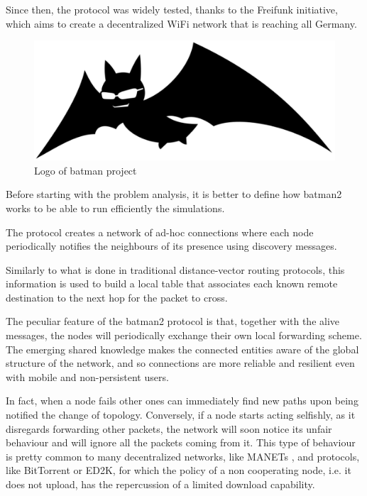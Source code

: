 \documentclass[conference,10.5pt]{IEEEtran}
\begin{document}
Since then, the protocol was widely tested,  thanks to the Freifunk initiative, which aims to create a decentralized WiFi network that is reaching all Germany.

\begin{figure}[h]
  \centering
  \includegraphics[width=0.8\linewidth]{figures/logo.pdf}
  \caption{Logo of \gls{batman} project}
  \label{fig:batman_logo}
\end{figure}

\smallskip

Before starting with the problem analysis, it is better to define how \gls{batman2} works to be able to run efficiently the simulations.

The protocol creates a network of ad-hoc connections where each node periodically notifies the neighbours of its presence using discovery messages.

Similarly to what is done in traditional distance-vector routing protocols, this information is used to build a local table that associates each known remote destination to the next hop for the packet to cross.

The peculiar feature of the \gls{batman2} protocol is that, together with the alive messages, the nodes will periodically exchange their own local forwarding scheme. The emerging shared knowledge makes the connected entities aware of the global structure of the network, and so connections are more reliable and resilient even with mobile and non-persistent users.

In fact, when a node fails other ones can immediately find new paths upon being notified the change of topology.
Conversely, if a node starts acting selfishly, as it disregards forwarding other packets, the network will soon notice its unfair behaviour and will ignore all the packets coming from it.
This type of behaviour is pretty common to many decentralized networks, like MANETs \cite{MANETs}, and protocols, like BitTorrent or ED2K, for which the policy of a non cooperating node, i.e. it does not upload, has the repercussion of a limited download capability.\cite{BitTorrent,ed2k}
\end{document}
